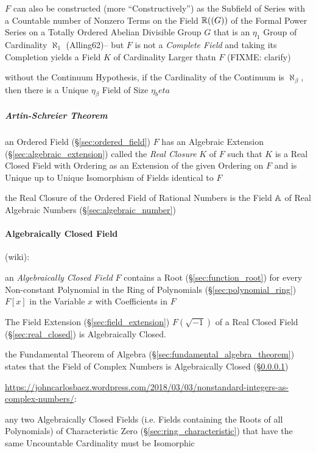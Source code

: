 $F$ can also be constructed (more ``Constructively'') as the Subfield of Series
with a Countable number of Nonzero Terms on the Field $\mathbb{R}((G))$ of the
Formal Power Series on a Totally Ordered Abelian Divisible Group $G$ that is an
$\eta_1$ Group of Cardinality $\aleph_1$ (Alling62)-- but $F$ is not a
\emph{Complete Field} and taking its Completion yields a Field $K$ of
Cardinality Larger thatn $F$ (FIXME: clarify)

without the Continuum Hypothesis, if the Cardinality of the Continuum is
$\aleph_\beta$, then there is a Unique $\eta_\beta$ Field of Size $\eta_beta$



\subparagraph{Artin-Schreier Theorem}\label{sec:artin_schreier}\hfill

an Ordered Field (\S\ref{sec:ordered_field}) $F$ has an Algebraic Extension
(\S\ref{sec:algebraic_extension}) called the \emph{Real Closure} $K$ of $F$
such that $K$ is a Real Closed Field with Ordering as an Extension of the given
Ordering on $F$ and is Unique up to Unique Isomorphism of Fields identical to
$F$

the Real Closure of the Ordered Field of Rational Numbers is the Field
$\mathbb{A}$ of Real Algebraic Numbers (\S\ref{sec:algebraic_number})



\paragraph{Algebraically Closed Field}\label{sec:algebraically_closed}
\hfill

(wiki):

an \emph{Algebraically Closed Field} $F$ contains a Root
(\S\ref{sec:function_root}) for every Non-constant Polynomial in the Ring of
Polynomials (\S\ref{sec:polynomial_ring}) $F[x]$ in the Variable $x$ with
Coefficients in $F$

The Field Extension (\S\ref{sec:field_extension}) $F(\sqrt{-1})$ of a
Real Closed Field (\S\ref{sec:real_closed}) is Algebraically Closed.

the Fundamental Theorem of Algebra (\S\ref{sec:fundamental_algebra_theorem})
states that the Field of Complex Numbers is Algebraically Closed
(\S\ref{sec:algebraically_closed})

\url{https://johncarlosbaez.wordpress.com/2018/03/03/nonstandard-integers-as-complex-numbers/}:

any two Algebraically Closed Fields (i.e. Fields containing the Roots of all
Polynomials) of Characteristic Zero (\S\ref{sec:ring_characteristic}) that have
the same Uncountable Cardinality must be Isomorphic


